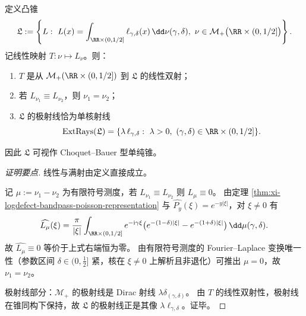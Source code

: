 \begin{theorem}\label{thm:xi-logdefect-cone-choquet-bauer-completeness}
定义凸锥
\[
\mathfrak{L}
:=
\left\{
L:\ 
L(x)=\int_{\RR\times(0,1/2]}\ell_{\gamma,\delta}(x)\,\dd\nu(\gamma,\delta),\
\nu\in\mathcal{M}_+\bigl(\RR\times(0,1/2]\bigr)
\right\}.
\]
记线性映射 \(T:\nu\mapsto L_\nu\)。则：
\begin{enumerate}
  \item \(T\) 是从 \(\mathcal{M}_+(\RR\times(0,1/2])\) 到 \(\mathfrak{L}\) 的线性双射；
  \item 若 \(L_{\nu_1}\equiv L_{\nu_2}\)，则 \(\nu_1=\nu_2\)；
  \item \(\mathfrak{L}\) 的极射线恰为单核射线
  \[
  \mathrm{ExtRays}(\mathfrak{L})
  =
  \{\lambda\,\ell_{\gamma,\delta}:\ \lambda>0,\ (\gamma,\delta)\in\RR\times(0,1/2]\}.
  \]
\end{enumerate}
因此 \(\mathfrak{L}\) 可视作 Choquet--Bauer 型单纯锥。
\end{theorem}
\begin{proof}[证明要点]
线性与满射由定义直接成立。

记 \(\mu:=\nu_1-\nu_2\) 为有限符号测度，若 \(L_{\nu_1}\equiv L_{\nu_2}\) 则 \(L_\mu\equiv0\)。
由定理 \ref{thm:xi-logdefect-bandpass-poisson-representation} 与
\(\widehat{P_y}(\xi)=e^{-y|\xi|}\)，对 \(\xi\neq0\) 有
\[
\widehat{L_\mu}(\xi)
=
\frac{\pi}{|\xi|}
\int_{\RR\times(0,1/2]}
e^{-\mathrm{i}\gamma\xi}
\bigl(e^{-(1-\delta)|\xi|}-e^{-(1+\delta)|\xi|}\bigr)\,\dd\mu(\gamma,\delta).
\]
故 \(\widehat{L_\mu}\equiv0\) 等价于上式右端恒为零。
由有限符号测度的 Fourier--Laplace 变换唯一性（参数区间 \(\delta\in(0,\tfrac12]\) 紧，核在 \(\xi\neq0\) 上解析且非退化）可推出 \(\mu=0\)，故 \(\nu_1=\nu_2\)。

极射线部分：\(\mathcal{M}_+\) 的极射线是 Dirac 射线 \(\lambda\delta_{(\gamma,\delta)}\)。
由 \(T\) 的线性双射性，极射线在锥同构下保持，故 \(\mathfrak{L}\) 的极射线正是其像 \(\lambda\ell_{\gamma,\delta}\)。证毕。
\end{proof}

